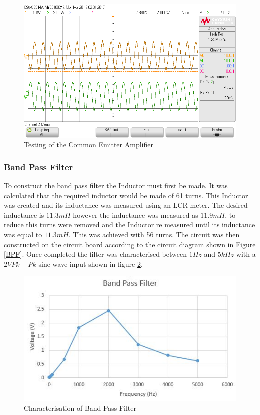 \documentclass[10pt,a4paper]{article}
\begin{document}
\begin{figure}[!h]



\includegraphics[width=\textwidth]{CEE}

\caption{Testing of the Common Emitter Amplifier}
\label{CEE}
\end{figure}
\subsubsection{Band Pass Filter}
To construct the band pass filter the Inductor must first be made. It was calculated that the required inductor would be made of 61 turns. This Inductor was created and its inductance was measured using an LCR meter. The desired inductance is $11.3mH$ however the inductance was measured as $11.9mH$, to reduce this turns were removed and the Inductor re measured until its inductance was equal to $11.3mH$. This was achieved with 56 turns. The circuit was then constructed on the circuit board according to the circuit diagram shown in Figure \ref{BPF}. Once completed the filter was characterised between $1Hz$ and $5kHz$ with a $2V Pk-Pk$ sine wave input shown in figure \ref{BandPassFilter}. 

\begin{figure}[!h]
\includegraphics[width= \textwidth]{BPF}
\caption{Characterisation of Band Pass Filter}
\label{BandPassFilter}
\end{figure}
\end{document}
